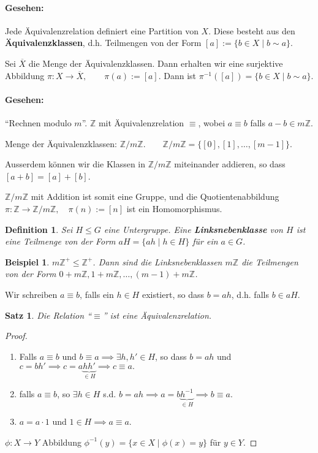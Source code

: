 \documentclass{article}
\theoremstyle{plain}
\newtheorem{definition}{Definition}
\newtheorem{theorem}{Satz}
\newtheorem{beispiel}{Beispiel}
\newcommand{\defn}[1]{\textbf{#1}}
\newcommand{\defeq}{:=}
\newcommand{\Z}{\mathbb{Z}}
\newcommand{\ug}{\leq}
\begin{document}
\paragraph{Gesehen:} Jede Äquivalenzrelation definiert eine Partition von $X$. Diese besteht aus den \defn{Äquivalenzklassen}, d.h. Teilmengen von der Form $[a]\defeq\{b\in X\mid b\sim a\}$.

Sei $\overline{X}$ die Menge der Äquivalenzklassen. Dann  erhalten wir eine surjektive Abbildung $\pi\colon X\to \overline{X}, \qquad \pi(a) \defeq [a]$.
Dann ist $\pi^{-1}([a])=\{b\in X\mid b\sim a\}$.

\paragraph{Gesehen:} ``Rechnen modulo $m$''.
$\Z$ mit Äquivalenzrelation $\equiv$, wobei $a\equiv b$ falls $a-b\in m\Z$.

Menge der Äquivalenzklassen: $\Z/m\Z$.$\qquad \Z/m\Z = \{[0],[1],\ldots,[m-1]\}$.

Ausserdem können wir die Klassen in $\Z/m\Z$ miteinander addieren, so dass $[a+b]=[a]+[b]$.

$\Z/m\Z$ mit Addition ist somit eine Gruppe, und die Quotientenabbildung $\pi\colon \Z\to\Z/m\Z,\quad \pi(n)\defeq[n]$ ist ein Homomorphismus.

\begin{definition}
    Sei $H\ug G$ eine Untergruppe. Eine \defn{Linksnebenklasse} von $H$ ist eine Teilmenge von der Form $aH=\{ah\mid h\in H\}$ für ein $a\in G$.
\end{definition}

\begin{beispiel}
    $m\Z^+\ug\Z^+$. Dann sind die Linksnebenklassen $m\Z$ die Teilmengen von der Form $0+m\Z, 1+m\Z,\ldots,(m-1)+m\Z$.
\end{beispiel}

Wir schreiben $a\equiv b$, falls ein $h\in H$ existiert, so dass $b=ah$, d.h. falls $b\in aH$.

\begin{theorem}
    Die Relation ``$\equiv$'' ist eine Äquivalenzrelation.
\end{theorem}
\begin{proof}
    \begin{enumerate}
        \item Falls $a\equiv b$ und $b\equiv a \implies \exists h,h'\in H$, so dass $b=ah$ und $c=bh' \implies c=a\underbrace{hh'}_{\in H}\implies c\equiv a.$
        \item falls $a\equiv b$, so $\exists h\in H$ s.d. $b=ah \implies a=b\underbrace{h^{-1}}_{\in H}\implies b\equiv a$.
        \item $a=a\cdot 1$ und $1\in H\implies a\equiv a$.
    \end{enumerate}
    $\phi\colon X\to Y$ Abbildung $\phi^{-1}(y) = \{x\in X\mid \phi(x)=y\}$ für $y\in Y$.
\end{proof}
\end{document}
